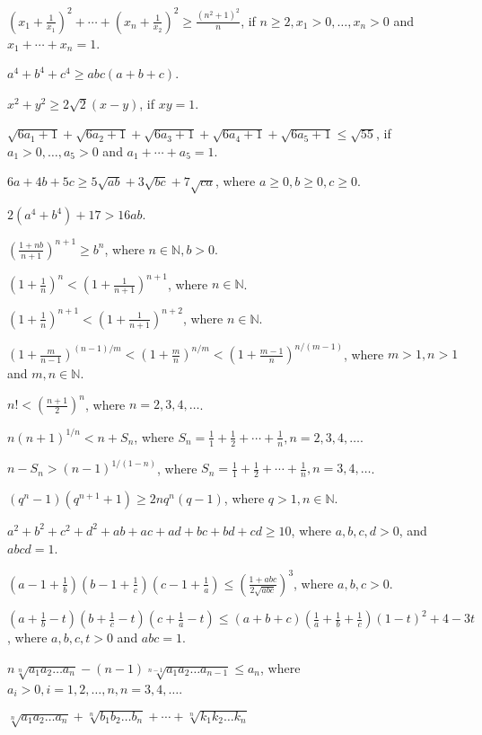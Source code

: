 \item $\left(x_1 + \frac{1}{x_1}\right)^2 + \cdots + \left(x_n + \frac{1}{x_2}\right)^2\geq \frac{(n^2 + 1)^2}{n}$, if $n\geq 2,
  x_1> 0, \ldots, x_n>0$ and $x_1 + \cdots + x_n = 1$.
\item $a^4 + b^4 + c^4 \geq abc(a + b + c)$.
\item $x^2 + y^2 \geq 2\sqrt{2}(x - y)$, if $xy = 1$.
\item $\sqrt{6a_1 + 1} + \sqrt{6a_2 + 1} + \sqrt{6a_3 + 1} + \sqrt{6a_4 + 1} + \sqrt{6a_5 + 1}\leq \sqrt{55}$, if $a_1 > 0, \ldots,
  a_5 > 0$ and $a_1 + \cdots + a_5 = 1$.
\item $6a + 4b + 5c\geq 5\sqrt{ab} + 3\sqrt{bc} + 7\sqrt{ca}$, where $a\geq 0, b\geq 0, c\geq 0$.
\item $2(a^4 + b^4) + 17 > 16 ab$.
\item $\left(\frac{1 + nb}{n + 1}\right)^{n + 1}\geq b^n$, where $n\in\mathbb{N}, b > 0$.
\item $\left(1 + \frac{1}{n}\right)^n < \left(1 + \frac{1}{n + 1}\right)^{n + 1}$, where $n\in\mathbb{N}$.
\item $\left(1 + \frac{1}{n}\right)^{n + 1} < \left(1 + \frac{1}{n + 1}\right)^{n + 2}$, where $n\in\mathbb{N}$.
\item $\left(1 + \frac{m}{n - 1}\right)^{(n - 1)/m} < \left(1 + \frac{m}{n}\right)^{n/m} < \left(1 + \frac{m - 1}{n}\right)^{n/(m
  - 1)}$, where $m > 1, n > 1$ and $m,n \in\mathbb{N}$.
\item $n!< \left(\frac{n + 1}{2}\right)^n$, where $n = 2, 3, 4, \ldots$.
\item $n(n + 1)^{1/n} < n + S_n$, where $S_n = \frac{1}{1} + \frac{1}{2} + \cdots + \frac{1}{n}, n = 2, 3, 4, \ldots$.
\item $n - S_n > (n - 1)^{1/(1 - n)}$, where $S_n = \frac{1}{1} + \frac{1}{2} + \cdots + \frac{1}{n}, n = 3, 4, \ldots$.
\item $(q^n - 1)(q^{n + 1} + 1)\geq 2nq^n(q - 1)$, where $q > 1, n \in\mathbb{N}$.
\item $a^2 + b^2 + c^2 + d^2 + ab + ac + ad + bc + bd + cd\geq 10$, where $a, b, c, d>0$, and $abcd = 1$.
\item $\left(a - 1 + \frac{1}{b}\right)\left(b - 1 + \frac{1}{c}\right)\left(c - 1 + \frac{1}{a}\right)\leq \left(\frac{1 +
  abc}{2\sqrt{abc}}\right)^3$, where $a, b, c> 0$.
\item $\left(a + \frac{1}{b} - t\right)\left(b + \frac{1}{c} - t\right)\left(c + \frac{1}{a} - t\right)\leq (a + b +
  c)\left(\frac{1}{a} + \frac{1}{b} + \frac{1}{c}\right)(1 - t)^2 + 4 - 3t$, where $a, b,c, t > 0$ and $abc = 1$.
\item $n\sqrt[n]{a_1a_2\ldots a_n} - (n - 1)\sqrt[n - 1]{a_1a_2\ldots a_{n - 1}} \leq a_n$, where $a_i > 0, i = 1, 2,
  \ldots, n, n = 3, 4, \ldots$.
\item $\sqrt[n]{a_1a_2\ldots a_n} + \sqrt[n]{b_1b_2\ldots b_n} + \cdots + \sqrt[n]{k_1k_2\ldots k_n}$

